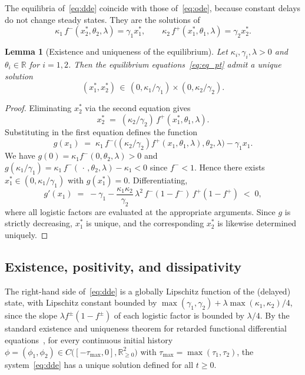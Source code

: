 \documentclass[sn-mathphys,Numbered]{sn-jnl}
\theoremstyle{thmstyleone}
\newtheorem{lemma}[theorem]{Lemma}
\theoremstyle{thmstyletwo}
\theoremstyle{thmstylethree}
\begin{document}
The equilibria of~\eqref{eq:dde} coincide with those of~\eqref{eq:ode},
because constant delays do not change steady states. They are the solutions
of
\begin{equation}
\kappa_1\,f^-(x_2^*,\theta_2,\lambda) = \gamma_1 x_1^*,
\qquad
\kappa_2\,f^+(x_1^*,\theta_1,\lambda) = \gamma_2 x_2^*.
\label{eq:eq_pt}
\end{equation}
\begin{lemma}[Existence and uniqueness of the equilibrium]
\label{lem:eq_unique}
Let $\kappa_i,\gamma_i,\lambda>0$ and $\theta_i\in\mathbb{R}$ for
$i=1,2$. Then the equilibrium equations~\eqref{eq:eq_pt} admit a unique
solution
\[
(x_1^*,x_2^*)\,\in\,
(0,\kappa_1/\gamma_1)\times(0,\kappa_2/\gamma_2).
\]
\end{lemma}
\begin{proof}
Eliminating $x_2^*$ via the second equation gives
\[
x_2^* \;=\; (\kappa_2/\gamma_2)\, f^+(x_1^*,\theta_1,\lambda).
\]
Substituting in the first equation defines the function
\[
g(x_1) \;=\; \kappa_1\,
   f^-\!\bigl((\kappa_2/\gamma_2)f^+(x_1,\theta_1,\lambda),
              \theta_2,\lambda\bigr) - \gamma_1 x_1.
\]
We have $g(0) = \kappa_1 f^-(0,\theta_2,\lambda)>0$ and
$g(\kappa_1/\gamma_1) =
\kappa_1\, f^-(\,\cdot\,,\theta_2,\lambda)-\kappa_1 < 0$ since
$f^-<1$. Hence there exists $x_1^*\in(0,\kappa_1/\gamma_1)$ with
$g(x_1^*)=0$. Differentiating,
\[
g'(x_1) \;=\; -\gamma_1
- \frac{\kappa_1\kappa_2}{\gamma_2}\,\lambda^2\,
   f^-(1-f^-)\,f^+(1-f^+) \;<\; 0,
\]
where all logistic factors are evaluated at the appropriate arguments.
Since $g$ is strictly decreasing, $x_1^*$ is unique, and the
corresponding $x_2^*$ is likewise determined uniquely.
\end{proof}

\subsection{Existence, positivity, and dissipativity}
\label{sec:existence}

The right-hand side of~\eqref{eq:dde} is a globally Lipschitz function of
the (delayed) state, with Lipschitz constant bounded by
$\max(\gamma_1,\gamma_2) + \lambda \max(\kappa_1,\kappa_2)/4$, since the
slope $\lambda f^\pm(1-f^\pm)$ of each logistic factor is bounded by
$\lambda/4$. By the standard existence and uniqueness theorem for
retarded functional differential
equations~\cite[Thm.~2.2.1]{hale1993introduction}, for every continuous
initial history
$\phi=(\phi_1,\phi_2)\in C\bigl([-\tau_{\max},0],\mathbb{R}_{\geq 0}^2\bigr)$
with $\tau_{\max}=\max(\tau_1,\tau_2)$, the system~\eqref{eq:dde} has a
unique solution defined for all $t\geq 0$.
\end{document}
